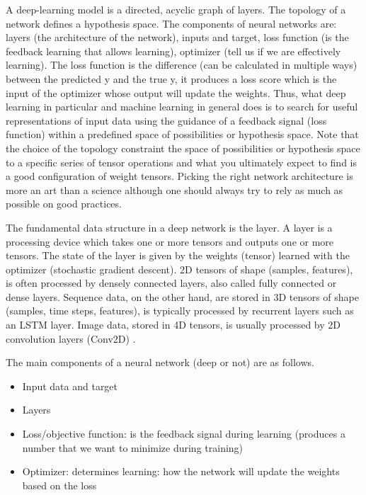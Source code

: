 \documentclass[11pt]{article}
\theoremstyle{definition}
\theoremstyle{remark}
\begin{document}
{%
A deep-learning model is a directed, acyclic graph of layers. The topology of a network defines a hypothesis space.
The components of neural networks are: layers (the architecture of the network), inputs and target, loss function (is the feedback learning that allows learning), optimizer (tell us if we are effectively learning). The loss function is the difference (can be calculated in multiple ways) between the predicted y and the true y, it produces a loss score which is the input of the optimizer whose output will update the weights. 
Thus, what deep learning in particular and machine learning in general does is to search for useful representations of input data using the guidance of a feedback signal (loss function) within a predefined space of possibilities or hypothesis space. Note that the choice of the topology constraint the space of possibilities or hypothesis space to a specific series of tensor operations and what you ultimately expect to find is a good configuration of weight tensors. Picking the right network architecture is more an art than a science although one should always try to rely as much as possible on good practices.

The fundamental data structure in a deep network is the layer. A layer is a processing device which takes one or more tensors and outputs one or more tensors. The state of the layer is given by the weights (tensor) learned with the optimizer (stochastic gradient descent).
2D tensors of shape (samples, features), is often processed by densely connected layers, also called fully connected or dense layers. Sequence data, on the other hand, are stored in 3D tensors of shape (samples, time steps, features), is typically processed by recurrent layers such as an LSTM layer. Image data, stored in 4D tensors, is usually processed by 2D convolution layers (Conv2D) \cite{chollet2017deep}.

The main components of a neural network (deep or not) are as follows.
\begin{itemize}
	\item Input data and target
	\item Layers
	\item Loss/objective function: is the feedback signal during learning (produces a number that we want to minimize during training) 
	\item Optimizer: determines learning: how the network will update the weights based on the loss


\end{itemize}}
\end{document}
